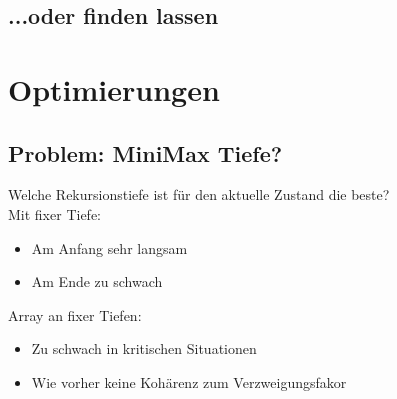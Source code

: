 \documentclass[12pt, draft]{beamer}
\begin{document}
\subsection{...oder finden lassen}
\begin{frame}
\end{frame}

\section{Optimierungen}
\subsection{Problem: MiniMax Tiefe?}
\begin{frame}
Welche Rekursionstiefe ist für den aktuelle Zustand die beste?\\
\pause
Mit fixer Tiefe:
\begin{itemize}
	\item Am Anfang sehr langsam
	\item Am Ende zu schwach
\end{itemize}
\pause
Array an fixer Tiefen:
\begin{itemize}
	\item Zu schwach in kritischen Situationen
	\item Wie vorher keine Kohärenz zum Verzweigungsfakor
\end{itemize}
\end{frame}
\end{document}

